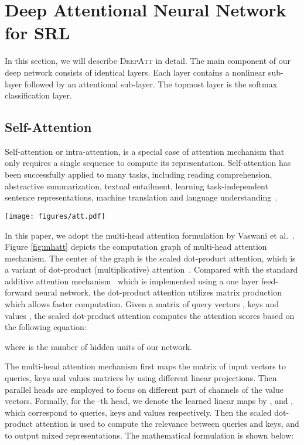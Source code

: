 \documentclass[letterpaper]{article} \usepackage{aaai18}  \usepackage{times}  \usepackage{helvet}  \usepackage{courier}  \usepackage{url}  \usepackage{graphicx}  \frenchspacing  \setlength{\pdfpagewidth}{8.5in}  \setlength{\pdfpageheight}{11in}  \usepackage{latexsym}
\begin{document}
\section{Deep Attentional Neural Network for SRL}
In this section, we will describe \textsc{DeepAtt} in detail. The main component of our deep network consists of  identical layers. Each layer contains a nonlinear sub-layer followed by an attentional sub-layer. The topmost layer is the softmax classification layer.

\subsection{Self-Attention}
Self-attention or intra-attention, is a special case of attention mechanism that only requires a single sequence to compute its representation. Self-attention has been successfully applied to many tasks, including reading comprehension, abstractive summarization, textual entailment, learning task-independent sentence representations, machine translation and language understanding~\cite{cheng2016long,parikh2016decomposable,lin2017structured,paulus2017deep,vaswani2017attention,shen2017disan}.

\begin{figure*}[!ht]
\centering
\texttt{[image: figures/att.pdf]}
\caption{The computation graph of multi-head self-attention mechanism. All heads can be computed in parallel using highly optimized matrix multiplication codes.}
\label{fig:mhatt}
\end{figure*}

In this paper, we adopt the multi-head attention formulation by Vaswani et al.~. Figure \ref{fig:mhatt} depicts the computation graph of multi-head attention mechanism. The center of the graph is the scaled dot-product attention, which is a variant of dot-product (multiplicative) attention~\cite{luong2015effective}. Compared with the standard additive attention mechanism~\cite{bahdanau2014neural} which is implemented using a one layer feed-forward neural network, the dot-product attention utilizes matrix production which allows faster computation. Given a matrix of  query vectors , keys  and values , the scaled dot-product attention computes the attention scores based on the following equation:

where  is the number of hidden units of our network.

The multi-head attention mechanism first maps the matrix of input vectors  to queries, keys and values matrices by using different linear projections. Then  parallel heads are employed to focus on different part of channels of the value vectors. Formally, for the -th head, we denote the learned linear maps by ,  and , which correspond to queries, keys and values respectively. Then the scaled dot-product attention is used to compute the relevance between queries and keys, and to output mixed representations. The mathematical formulation is shown below:
\end{document}
